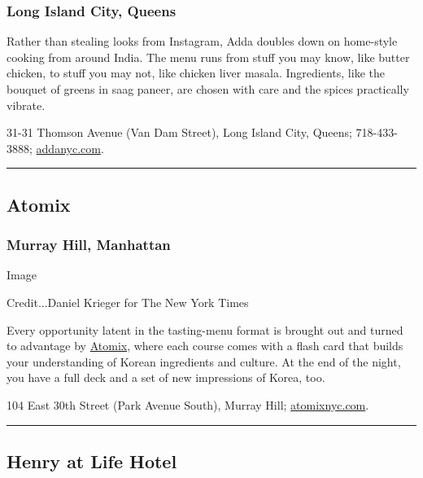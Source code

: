 \hypertarget{long-island-city-queens}{%
\subsubsection{Long Island City, Queens}\label{long-island-city-queens}}

Rather than stealing looks from Instagram, Adda doubles down on
home-style cooking from around India. The menu runs from stuff you may
know, like butter chicken, to stuff you may not, like chicken liver
masala. Ingredients, like the bouquet of greens in saag paneer, are
chosen with care and the spices practically vibrate.

31-31 Thomson Avenue (Van Dam Street), Long Island City, Queens;
718-433-3888; \href{https://www.addanyc.com/}{addanyc.com}.

\begin{center}\rule{0.5\linewidth}{\linethickness}\end{center}

\hypertarget{atomix}{%
\subsection{Atomix}\label{atomix}}

\hypertarget{murray-hill-manhattan}{%
\subsubsection{Murray Hill, Manhattan}\label{murray-hill-manhattan}}

Image

Credit...Daniel Krieger for The New York Times

Every opportunity latent in the tasting-menu format is brought out and
turned to advantage by
\href{https://www.nytimes3xbfgragh.onion/2018/10/16/dining/atomix-review-korean.html}{Atomix},
where each course comes with a flash card that builds your understanding
of Korean ingredients and culture. At the end of the night, you have a
full deck and a set of new impressions of Korea, too.

104 East 30th Street (Park Avenue South), Murray Hill;
\href{https://www.atomixnyc.com/}{atomixnyc.com}.

\begin{center}\rule{0.5\linewidth}{\linethickness}\end{center}

\hypertarget{henry-at-life-hotel}{%
\subsection{Henry at Life Hotel}\label{henry-at-life-hotel}}

